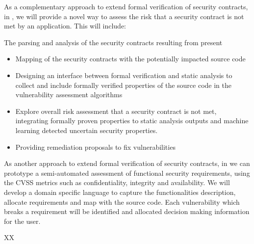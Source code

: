 \begin{Workpackage}{\thewpno}
\begin{Task}
\TaskResults{%
}
\TaskHeader{}

As a complementary approach to extend formal verification of security contracts, in \theTask, we will provide a novel way to assess the risk that a security contract is not met by an application. This will include:
\item The parsing and analysis of the security contracts resulting from present \theWP 
\begin{itemize}
    \item Mapping of the security contracts with the potentially impacted source code
    \item Designing an interface between formal verification and static analysis to collect and include formally verified properties of the source code in the vulnerability assessment algorithms
    \item Explore overall risk assessment that a security contract is not met, integrating formally proven properties to static analysis outputs and machine learning detected uncertain security properties.
    \item Providing remediation proposals to fix vulnerabilities
\end{itemize}

\end{Task}


\begin{Task}

\TaskResults{%
}
\TaskHeader{}

As another approach to extend formal verification of security contracts, in \theTask we can prototype a semi-automated assessment of functional security requirements, using the CVSS metrics such as confidentiality, integrity and availability.
We will develop a domain specific language to capture the functionalities description, allocate requirements and map with the source code. Each vulnerability which breaks a requirement will be identified and allocated decision making information for the user.
\end{Task}


\begin{WPDeliverables}
  \begin{compactitem}
    \item XX
\end{compactitem}
\end{WPDeliverables}
\end{Workpackage}
